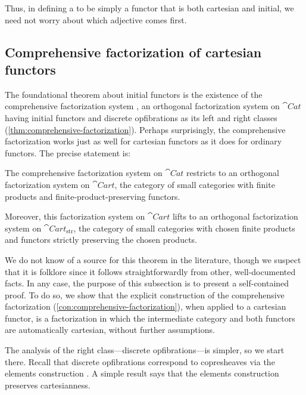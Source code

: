 \documentclass[11pt]{article}
\numberwithin{equation}{section}
\begin{document}
Thus, in defining a  to be simply a functor
that is both cartesian and initial, we need not worry about which adjective
comes first.

\subsection{Comprehensive factorization of cartesian functors}

The foundational theorem about initial functors is the existence of the
comprehensive factorization system \cite{street1973}, an orthogonal
factorization system on $\cat{Cat}$ having initial functors and discrete
opfibrations as its left and right classes
(\cref{thm:comprehensive-factorization}). Perhaps surprisingly, the
comprehensive factorization works just as well for cartesian functors as it does
for ordinary functors. The precise statement is:

\begin{theorem}
  \label{thm:cartesian-comprehensive-factorization}
  The comprehensive factorization system on $\cat{Cat}$ restricts to an
  orthogonal factorization system on $\cat{Cart}$, the category of small
  categories with finite products and finite-product-preserving functors.

  Moreover, this factorization system on $\cat{Cart}$ lifts to an orthogonal
  factorization system on $\cat{Cart}_{\mathrm{str}}$, the category of small
  categories with chosen finite products and functors strictly preserving the
  chosen products.
\end{theorem}

We do not know of a source for this theorem in the literature, though we suspect
that it is folklore since it follows straightforwardly from other,
well-documented facts. In any case, the purpose of this subsection is to present
a self-contained proof. To do so, we show that the explicit construction of the
comprehensive factorization (\cref{con:comprehensive-factorization}), when
applied to a cartesian functor, is a factorization in which the intermediate
category and both functors are automatically cartesian, without further
assumptions.

The analysis of the right class---discrete opfibrations---is simpler, so we
start there. Recall that discrete opfibrations correspond to copresheaves via
the elements construction \cite[\S{2.4}]{riehl2016}. A simple result says that
the elements construction preserves cartesianness.
\end{document}
